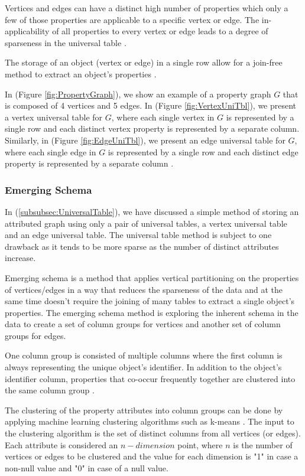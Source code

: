 {Vertices and edges can have a distinct high number of properties which only a few of those properties are applicable to a specific vertex or edge. The in-applicability of all properties to every vertex or edge leads to a degree of sparseness in the universal table \cite{Paradies2017}.

The storage of an object (vertex or edge) in a single row allow for a join-free method to extract an object's properties \cite{Paradies2017}.

In (Figure \ref{fig:PropertyGraph}), we show an example of a property graph $G$ that is composed of 4 vertices and 5 edges. In (Figure \ref{fig:VertexUniTbl}), we present a vertex universal table for $G$, where each single vertex in $G$ is represented by a single row and each distinct vertex property is represented by a separate column. Similarly, in (Figure \ref{fig:EdgeUniTbl}), we present an edge universal table for $G$, where each single edge in $G$ is represented by a single row and each distinct edge property is represented by a separate column \cite{Paradies2017}.


\subsubsection{Emerging Schema}
\label{subsubsec:EmergingSchema}

In (\ref{subsubsec:UniversalTable}), we have discussed a simple method of storing an attributed graph using only a pair of universal tables, a vertex universal table and an edge universal table. The universal table method is subject to one drawback as it tends to be more sparse as the number of distinct attributes increase.

Emerging schema is a method that applies vertical partitioning on the properties of vertices/edges in a way that reduces the sparseness of the data and at the same time doesn't require the joining of many tables to extract a single object's properties. The emerging schema method is exploring the inherent schema in the data to create a set of column groups for vertices and another set of column groups for edges. 

One column group is consisted of multiple columns where the first column is always representing the unique object's identifier. In addition to the object's identifier column, properties that co-occur frequently together are clustered into the same column group \cite{Paradies2017}.

The clustering of the property attributes into column groups can be done by applying machine learning clustering algorithms such as k-means \cite{Paradies2017}. The input to the clustering algorithm is the set of distinct columns from all vertices (or edges). Each attribute is considered an $n-dimension$ point, where $n$ is the number of vertices or edges to be clustered and the value for each dimension is "1" in case a non-null value and "0" in case of a null value.

}
